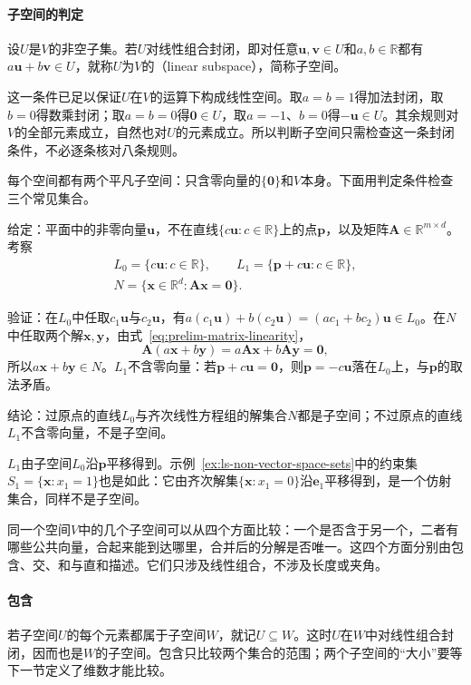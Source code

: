 \paragraph{子空间的判定}
设$U$是$V$的非空子集。若$U$对线性组合封闭，即对任意$\bm u,\bm v\in U$和$a,b\in\mathbb R$都有$a\bm u+b\bm v\in U$，就称$U$为$V$的（linear subspace），简称子空间。

这一条件已足以保证$U$在$V$的运算下构成线性空间。取$a=b=1$得加法封闭，取$b=0$得数乘封闭；取$a=b=0$得$\bm0\in U$，取$a=-1$、$b=0$得$-\bm u\in U$。其余规则对$V$的全部元素成立，自然也对$U$的元素成立。所以判断子空间只需检查这一条封闭条件，不必逐条核对八条规则。

每个空间都有两个平凡子空间：只含零向量的$\{\bm0\}$和$V$本身。下面用判定条件检查三个常见集合。
\begin{example}
\label{ex:ls-subspace-checks}
给定：平面中的非零向量$\bm u$，不在直线$\{c\bm u:c\in\mathbb R\}$上的点$\bm p$，以及矩阵$\bm A\in\mathbb R^{m\times d}$。考察
\[
 \begin{gathered}
 L_0=\{c\bm u:c\in\mathbb R\},
 \qquad
 L_1=\{\bm p+c\bm u:c\in\mathbb R\},\\
 N=\{\bm x\in\mathbb R^d:\bm A\bm x=\bm0\}.
 \end{gathered}
\]

验证：在$L_0$中任取$c_1\bm u$与$c_2\bm u$，有$a(c_1\bm u)+b(c_2\bm u)=(ac_1+bc_2)\bm u\in L_0$。在$N$中任取两个解$\bm x,\bm y$，由式~\eqref{eq:prelim-matrix-linearity}，
\[
 \bm A(a\bm x+b\bm y)=a\bm A\bm x+b\bm A\bm y=\bm0,
\]
所以$a\bm x+b\bm y\in N$。$L_1$不含零向量：若$\bm p+c\bm u=\bm0$，则$\bm p=-c\bm u$落在$L_0$上，与$\bm p$的取法矛盾。

结论：过原点的直线$L_0$与齐次线性方程组的解集合$N$都是子空间；不过原点的直线$L_1$不含零向量，不是子空间。
\end{example}
$L_1$由子空间$L_0$沿$\bm p$平移得到。示例~\ref{ex:ls-non-vector-space-sets}中的约束集$S_1=\{\bm x:x_1=1\}$也是如此：它由齐次解集$\{\bm x:x_1=0\}$沿$\bm e_1$平移得到，是一个仿射集合，同样不是子空间。

同一个空间$V$中的几个子空间可以从四个方面比较：一个是否含于另一个，二者有哪些公共向量，合起来能到达哪里，合并后的分解是否唯一。这四个方面分别由包含、交、和与直和描述。它们只涉及线性组合，不涉及长度或夹角。

\paragraph{包含}
\label{sec:ls-subspace-inclusion}
若子空间$U$的每个元素都属于子空间$W$，就记$U\subseteq W$。这时$U$在$W$中对线性组合封闭，因而也是$W$的子空间。包含只比较两个集合的范围；两个子空间的“大小”要等下一节定义了维数才能比较。

